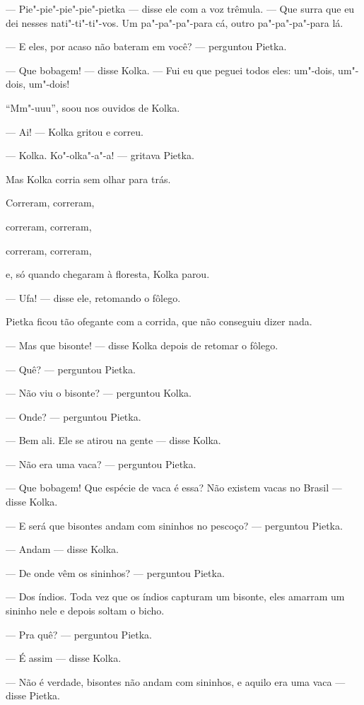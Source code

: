 --- Pie"-pie"-pie"-pie"-pietka --- disse ele com a voz trêmula. --- Que
surra que eu dei nesses nati"-ti"-ti"-vos. Um pa"-pa"-pa"-para cá, outro
pa"-pa"-pa"-para lá.

--- E eles, por acaso não bateram em você? --- perguntou Pietka.

--- Que bobagem! --- disse Kolka. --- Fui eu que peguei todos eles:
um"-dois, um"-dois, um"-dois!

``Mm"-uuu'', soou nos ouvidos de Kolka.

--- Ai! --- Kolka gritou e correu.

--- Kolka. Ko"-olka"-a"-a! --- gritava Pietka.

Mas Kolka corria sem olhar para trás.

Correram, correram,

correram, correram,

correram, correram,

e, só quando chegaram à floresta, Kolka parou.

--- Ufa! --- disse ele, retomando o fôlego.

Pietka ficou tão ofegante com a corrida, que não conseguiu dizer nada.

--- Mas que bisonte! --- disse Kolka depois de retomar o fôlego.

--- Quê? --- perguntou Pietka.

--- Não viu o bisonte? --- perguntou Kolka.

--- Onde? --- perguntou Pietka.

--- Bem ali. Ele se atirou na gente --- disse Kolka.

--- Não era uma vaca? --- perguntou Pietka.

--- Que bobagem! Que espécie de vaca é essa? Não existem vacas no Brasil
--- disse Kolka.

--- E será que bisontes andam com sininhos no pescoço? --- perguntou
Pietka.

--- Andam --- disse Kolka.

--- De onde vêm os sininhos? --- perguntou Pietka.

--- Dos índios. Toda vez que os índios capturam um bisonte, eles amarram
um sininho nele e depois soltam o bicho.

--- Pra quê? --- perguntou Pietka.

--- É assim --- disse Kolka.

--- Não é verdade, bisontes não andam com sininhos, e aquilo era uma
vaca --- disse Pietka.

